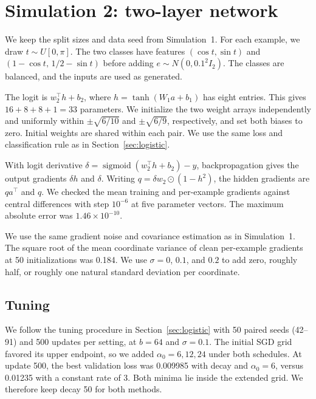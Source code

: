 \documentclass[11pt,a4paper]{article}
\begin{document}
\clearpage

\begingroup
\setlength{\intextsep}{7pt}
\section{Simulation 2: two-layer network}
\label{sec:network}

We keep the split sizes and data seed from Simulation~1. For each
example, we draw $t\sim U[0,\pi]$. The two classes have features
$(\cos t,\sin t)$ and $(1-\cos t,\,1/2-\sin t)$ before adding
$e\sim N(0,0.1^2 I_2)$. The classes are balanced, and the inputs
are used as generated.

The logit is $w_2^\top h+b_2$, where $h=\tanh(W_1a+b_1)$ has
eight entries. This gives $16+8+8+1=33$ parameters. We initialize
the two weight arrays independently and uniformly within
$\pm\sqrt{6/10}$ and $\pm\sqrt{6/9}$, respectively, and set both biases
to zero. Initial weights are shared within each pair. We use the same
loss and classification rule as in Section~\ref{sec:logistic}.

With logit derivative $\delta=\operatorname{sigmoid}(w_2^\top h+b_2)-y$,
backpropagation gives the output gradients $\delta h$ and $\delta$.
Writing $q=\delta w_2\odot(1-h^2)$, the hidden gradients are $qa^\top$
and $q$. We checked the mean training and per-example gradients against
central differences with step $10^{-6}$ at five parameter vectors.
The maximum absolute error was $1.46\times10^{-10}$.

We use the same gradient noise and covariance estimation as in
Simulation~1. The square root of the mean coordinate variance of
clean per-example gradients at 50 initializations was 0.184. We use
$\sigma=0$, $0.1$, and $0.2$ to add zero, roughly half, or roughly
one natural standard deviation per coordinate.

\subsection*{Tuning}

We follow the tuning procedure in Section~\ref{sec:logistic} with
50 paired seeds (42--91) and 500 updates per setting, at $b=64$ and
$\sigma=0.1$.
The initial SGD grid favored its upper endpoint, so we added
$\alpha_0=6,12,24$ under both schedules. At update 500, the best
validation loss was 0.009985 with decay and $\alpha_0=6$, versus
0.01235 with a constant rate of 3. Both minima lie inside the
extended grid. We therefore keep decay 50 for both methods.
\end{document}

